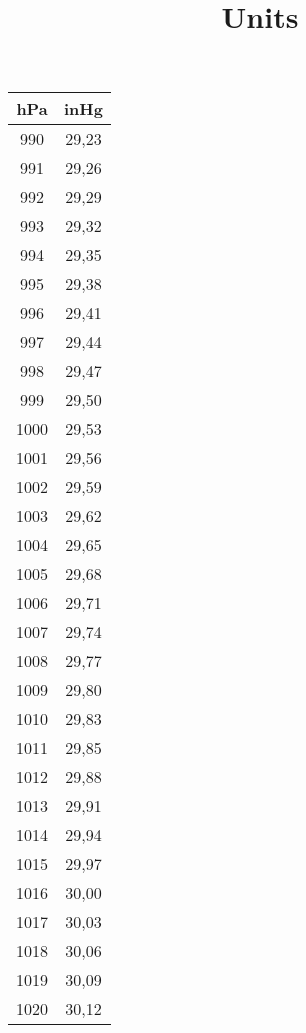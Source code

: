 \def\papersize{6}




\title{Units}

\begin{table}[!ht]
  \centering
  \tiny
  \begin{tabular}{|c|c|}
    \hline
    \cellcolor{black!90}\color{white}\textbf{hPa} & \cellcolor{black!90}\color{white}\textbf{inHg} \\ \hline
    990 & 29,23 \\ \hline
    991 & 29,26 \\ \hline
    992 & 29,29 \\ \hline
    993 & 29,32 \\ \hline
    994 & 29,35 \\ \hline
    995 & 29,38 \\ \hline
    996 & 29,41 \\ \hline
    997 & 29,44 \\ \hline
    998 & 29,47 \\ \hline
    999 & 29,50 \\ \hline
    1000 & 29,53 \\ \hline
    1001 & 29,56 \\ \hline
    1002 & 29,59 \\ \hline
    1003 & 29,62 \\ \hline
    1004 & 29,65 \\ \hline
    1005 & 29,68 \\ \hline
    1006 & 29,71 \\ \hline
    1007 & 29,74 \\ \hline
    1008 & 29,77 \\ \hline
    1009 & 29,80 \\ \hline
    1010 & 29,83 \\ \hline
    1011 & 29,85 \\ \hline
    1012 & 29,88 \\ \hline
    1013 & 29,91 \\ \hline
    1014 & 29,94 \\ \hline
    1015 & 29,97 \\ \hline
    1016 & 30,00 \\ \hline
    1017 & 30,03 \\ \hline
    1018 & 30,06 \\ \hline
    1019 & 30,09 \\ \hline
    1020 & 30,12 \\ \hline

\end{tabular}
\end{table}

